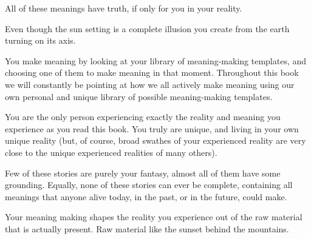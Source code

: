 All of these meanings have truth, if only for you in your reality.


Even though the sun setting is a complete illusion you create from the earth turning on its axis. 


You make meaning by looking at your library of meaning\hyp{}making templates, and choosing one of them to make meaning in that moment. Throughout this book we will constantly be pointing at how we all actively make meaning using our own personal and unique library of possible meaning\hyp{}making templates. 


You are the only person experiencing exactly the reality\cite{sci-am-reality} and meaning you experience as you read this book. You truly are unique, and living in your own unique reality (but, of course, broad swathes of your experienced reality are very close to the unique experienced realities of many others).


Few of these stories are purely your fantasy, almost all of them have some grounding. Equally, none of these stories can ever be complete, containing all meanings that anyone alive today, in the past, or in the future, could make. 


Your meaning making shapes the reality you experience out of the raw material that is actually present. Raw material like the sunset behind the mountains.


